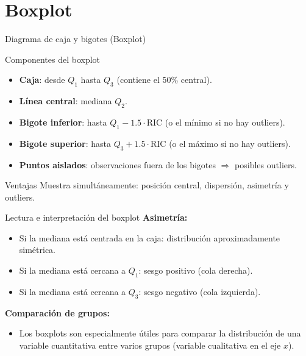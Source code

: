 \documentclass[aspectratio=169]{beamer}
\begin{document}
\section{Boxplot}

\begin{frame}{Diagrama de caja y bigotes (Boxplot)}
  \begin{block}{Componentes del boxplot}
    \begin{itemize}
      \item \textbf{Caja}: desde $Q_1$ hasta $Q_3$ (contiene el 50\% central).
      \item \textbf{Línea central}: mediana $Q_2$.
      \item \textbf{Bigote inferior}: hasta $Q_1 - 1.5 \cdot \text{RIC}$ (o el mínimo si no hay outliers).
      \item \textbf{Bigote superior}: hasta $Q_3 + 1.5 \cdot \text{RIC}$ (o el máximo si no hay outliers).
      \item \textbf{Puntos aislados}: observaciones fuera de los bigotes $\Rightarrow$ posibles outliers.
    \end{itemize}
  \end{block}
  \bigskip
  \begin{alertblock}{Ventajas}
    Muestra simultáneamente: posición central, dispersión, asimetría y outliers.
  \end{alertblock}
\end{frame}

\begin{frame}{Lectura e interpretación del boxplot}
  \textbf{Asimetría:}
  \begin{itemize}
    \item Si la mediana está centrada en la caja: distribución aproximadamente simétrica.
    \item Si la mediana está cercana a $Q_1$: sesgo positivo (cola derecha).
    \item Si la mediana está cercana a $Q_3$: sesgo negativo (cola izquierda).
  \end{itemize}
  \bigskip
  \textbf{Comparación de grupos:}
  \begin{itemize}
    \item Los boxplots son especialmente útiles para comparar la distribución de una variable cuantitativa entre varios grupos (variable cualitativa en el eje $x$).
  \end{itemize}
\end{frame}
\end{document}
